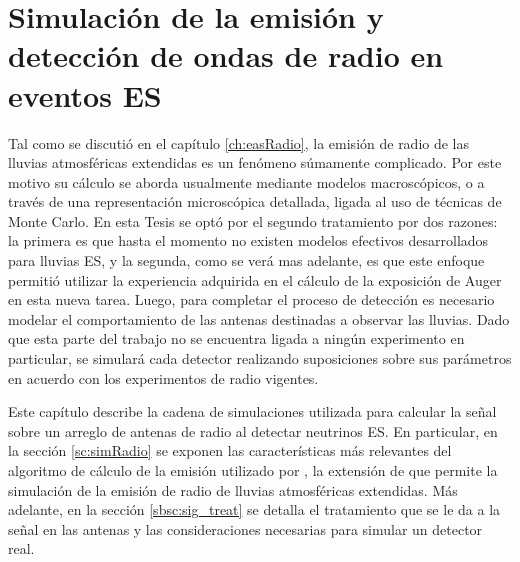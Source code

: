 \chapter{Simulaci\'on de la emisi\'on y detecci\'on de ondas de radio en eventos ES}
\label{ch:simulacionRadio}

Tal como se discuti\'o en el cap\'itulo \ref{ch:easRadio}, la emisi\'on de radio de las lluvias atmosf\'ericas extendidas es un fen\'omeno s\'umamente complicado.
Por este motivo su c\'alculo se aborda usualmente mediante modelos macrosc\'opicos, o a trav\'es de una representaci\'on microsc\'opica detallada, ligada al uso de t\'ecnicas de Monte Carlo.
En esta Tesis se opt\'o por el segundo tratamiento por dos razones: la primera es que hasta el momento no existen modelos efectivos desarrollados para lluvias ES, y la segunda, como se ver\'a mas adelante, es que este enfoque permiti\'o utilizar la experiencia adquirida en el c\'alculo de la exposici\'on de Auger en esta nueva tarea.
Luego, para completar el proceso de detecci\'on es necesario modelar el comportamiento de las antenas destinadas a observar las lluvias.
Dado que esta parte del trabajo no se encuentra ligada a ning\'un experimento en particular, se simular\'a cada detector realizando suposiciones sobre sus par\'ametros en acuerdo con los experimentos de radio vigentes.

Este cap\'itulo describe la cadena de simulaciones utilizada para calcular la se\~nal sobre un arreglo de antenas de radio al detectar neutrinos ES.  
En particular, en la secci\'on \ref{sc:simRadio} se exponen las caracter\'isticas m\'as relevantes del algoritmo de c\'alculo de la emisi\'on utilizado por \zhs{}, la extensi\'on de \aires{} que permite la simulaci\'on de la emisi\'on de radio de lluvias atmosf\'ericas extendidas.
M\'as adelante, en la secci\'on \ref{sbsc:sig_treat} se detalla el tratamiento que se le da a la se\~nal en las antenas y las consideraciones necesarias para simular un detector real.


